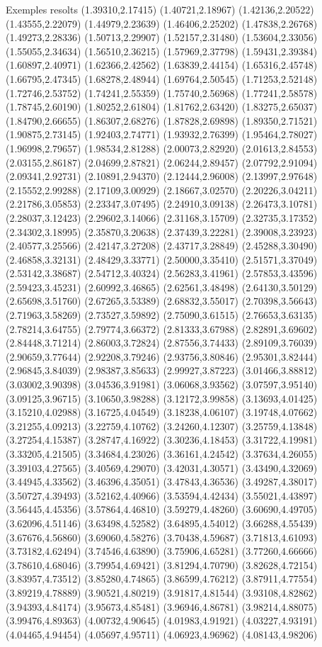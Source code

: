 \documentclass[11pt,a4paper]{article}
\begin{document}
\begin{fmex}{Exemples resolts}
(1.39310,2.17415) (1.40721,2.18967) (1.42136,2.20522) (1.43555,2.22079) (1.44979,2.23639) (1.46406,2.25202) (1.47838,2.26768) (1.49273,2.28336) (1.50713,2.29907) (1.52157,2.31480) (1.53604,2.33056) (1.55055,2.34634) (1.56510,2.36215) (1.57969,2.37798) (1.59431,2.39384) (1.60897,2.40971) (1.62366,2.42562) (1.63839,2.44154) (1.65316,2.45748) (1.66795,2.47345) (1.68278,2.48944) (1.69764,2.50545) (1.71253,2.52148) (1.72746,2.53752) (1.74241,2.55359) (1.75740,2.56968) (1.77241,2.58578) (1.78745,2.60190) (1.80252,2.61804) (1.81762,2.63420) (1.83275,2.65037) (1.84790,2.66655) (1.86307,2.68276) (1.87828,2.69898) (1.89350,2.71521) (1.90875,2.73145) (1.92403,2.74771) (1.93932,2.76399) (1.95464,2.78027) (1.96998,2.79657) (1.98534,2.81288) (2.00073,2.82920) (2.01613,2.84553) (2.03155,2.86187) (2.04699,2.87821) (2.06244,2.89457) (2.07792,2.91094) (2.09341,2.92731) (2.10891,2.94370) (2.12444,2.96008) (2.13997,2.97648) (2.15552,2.99288) (2.17109,3.00929) (2.18667,3.02570) (2.20226,3.04211) (2.21786,3.05853) (2.23347,3.07495) (2.24910,3.09138) (2.26473,3.10781) (2.28037,3.12423) (2.29602,3.14066) (2.31168,3.15709) (2.32735,3.17352) (2.34302,3.18995) (2.35870,3.20638) (2.37439,3.22281) (2.39008,3.23923) (2.40577,3.25566) (2.42147,3.27208) (2.43717,3.28849) (2.45288,3.30490) (2.46858,3.32131) (2.48429,3.33771) (2.50000,3.35410) (2.51571,3.37049) (2.53142,3.38687) (2.54712,3.40324) (2.56283,3.41961) (2.57853,3.43596) (2.59423,3.45231) (2.60992,3.46865) (2.62561,3.48498) (2.64130,3.50129) (2.65698,3.51760) (2.67265,3.53389) (2.68832,3.55017) (2.70398,3.56643) (2.71963,3.58269) (2.73527,3.59892) (2.75090,3.61515) (2.76653,3.63135) (2.78214,3.64755) (2.79774,3.66372) (2.81333,3.67988) (2.82891,3.69602) (2.84448,3.71214) (2.86003,3.72824) (2.87556,3.74433) (2.89109,3.76039) (2.90659,3.77644) (2.92208,3.79246) (2.93756,3.80846) (2.95301,3.82444) (2.96845,3.84039) (2.98387,3.85633) (2.99927,3.87223) (3.01466,3.88812) (3.03002,3.90398) (3.04536,3.91981) (3.06068,3.93562) (3.07597,3.95140) (3.09125,3.96715) (3.10650,3.98288) (3.12172,3.99858) (3.13693,4.01425) (3.15210,4.02988) (3.16725,4.04549) (3.18238,4.06107) (3.19748,4.07662) (3.21255,4.09213) (3.22759,4.10762) (3.24260,4.12307) (3.25759,4.13848) (3.27254,4.15387) (3.28747,4.16922) (3.30236,4.18453) (3.31722,4.19981) (3.33205,4.21505) (3.34684,4.23026) (3.36161,4.24542) (3.37634,4.26055) (3.39103,4.27565) (3.40569,4.29070) (3.42031,4.30571) (3.43490,4.32069) (3.44945,4.33562) (3.46396,4.35051) (3.47843,4.36536) (3.49287,4.38017) (3.50727,4.39493) (3.52162,4.40966) (3.53594,4.42434) (3.55021,4.43897) (3.56445,4.45356) (3.57864,4.46810) (3.59279,4.48260) (3.60690,4.49705) (3.62096,4.51146) (3.63498,4.52582) (3.64895,4.54012) (3.66288,4.55439) (3.67676,4.56860) (3.69060,4.58276) (3.70438,4.59687) (3.71813,4.61093) (3.73182,4.62494) (3.74546,4.63890) (3.75906,4.65281) (3.77260,4.66666) (3.78610,4.68046) (3.79954,4.69421) (3.81294,4.70790) (3.82628,4.72154) (3.83957,4.73512) (3.85280,4.74865) (3.86599,4.76212) (3.87911,4.77554) (3.89219,4.78889) (3.90521,4.80219) (3.91817,4.81544) (3.93108,4.82862) (3.94393,4.84174) (3.95673,4.85481) (3.96946,4.86781) (3.98214,4.88075) (3.99476,4.89363) (4.00732,4.90645) (4.01983,4.91921) (4.03227,4.93191) (4.04465,4.94454) (4.05697,4.95711) (4.06923,4.96962) (4.08143,4.98206) 
\end{fmex}
\end{document}
